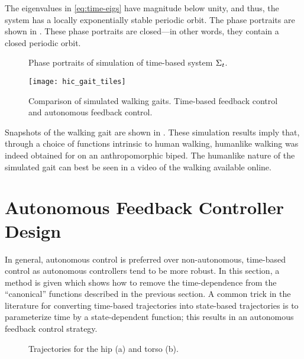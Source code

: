 The eigenvalues in \eqref{eq:time-eigs} have magnitude below unity, and thus,
the system has a locally exponentially stable periodic orbit.
%
The phase portraits are shown in .
%
These phase portraits are closed---in other words, they contain a closed
periodic orbit.
%
\begin{figure*}[t!]
  \centering
  \caption{Phase portraits of simulation of time-based system $\Sigma_t$.}
  \label{fig:pp-t}
\end{figure*}
%
\begin{figure}[t!]
  \centering
  \texttt{[image: hic\_gait\_tiles]}
  \caption[Comparison of simulated walking gaits.]{Comparison of simulated
    walking gaits. Time-based feedback control and autonomous feedback
    control.}
  \label{fig:gaittiles}
\end{figure}
%
Snapshots of the walking gait are shown in .
%
These simulation results imply that, through a choice of functions intrinsic to
human walking, humanlike walking was indeed obtained for on an anthropomorphic
biped.
%
The humanlike nature of the simulated gait can best be seen in a video of the
walking available online.


\section{Autonomous Feedback Controller Design}

In general, autonomous control is preferred over non-autonomous, time-based
control as autonomous controllers tend to be more robust.
%
In this section, a method is given which shows how to remove the time-dependence
from the ``canonical'' functions described in the previous section.
%
A common trick in the literature \cite{Westervelt2007} for converting time-based
trajectories into state-based trajectories is to parameterize time by a
state-dependent function;
%
this results in an autonomous feedback control strategy.

\begin{figure}[t]
  \centering
  \caption{Trajectories for the hip (a) and torso (b).}
  \label{fig:torso-hip}
\end{figure}



